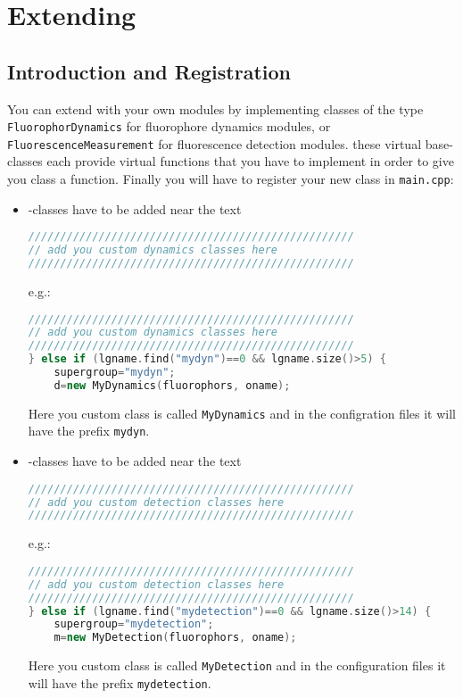 \chapter{Extending \df}
\label{sec:ExtendingDf}
\section{Introduction and Registration}
\label{sec:IntroductionAndRegistration}

You can extend \df with your own modules by implementing classes of the type \texttt{FluorophorDynamics} for fluorophore dynamics modules, or \texttt{FluorescenceMeasurement} for fluorescence detection modules. these virtual base-classes each provide virtual functions that you have to implement in order to give you class a function. Finally you will have to register your new class in \texttt{main.cpp}:
\begin{itemize}
	\item {}-classes have to be added near the text
		\begin{lstlisting}[language=c++] 
///////////////////////////////////////////////////
// add you custom dynamics classes here
///////////////////////////////////////////////////
		\end{lstlisting}	
		e.g.:
		\begin{lstlisting}[language=c++] 
///////////////////////////////////////////////////
// add you custom dynamics classes here
///////////////////////////////////////////////////
} else if (lgname.find("mydyn")==0 && lgname.size()>5) {
	supergroup="mydyn";
	d=new MyDynamics(fluorophors, oname);
		\end{lstlisting}	
		Here you custom class is called \texttt{MyDynamics} and in the configration files it will have the prefix \texttt{mydyn}.
	\item {}-classes have to be added near the text
		\begin{lstlisting}[language=c++] 
///////////////////////////////////////////////////
// add you custom detection classes here
///////////////////////////////////////////////////
		\end{lstlisting}	
		e.g.:
		\begin{lstlisting}[language=c++] 
///////////////////////////////////////////////////
// add you custom detection classes here
///////////////////////////////////////////////////
} else if (lgname.find("mydetection")==0 && lgname.size()>14) {
	supergroup="mydetection";
	m=new MyDetection(fluorophors, oname);
		\end{lstlisting}	
		Here you custom class is called \texttt{MyDetection} and in the configuration files it will have the prefix \texttt{mydetection}.
		
\end{itemize}

